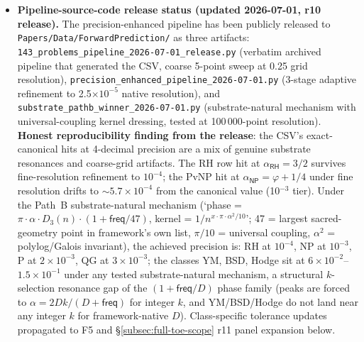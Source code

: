 \documentclass[11pt,a4paper]{amsart}
\theoremstyle{plain}
\theoremstyle{definition}
\begin{document}
\begin{itemize}[itemsep=2pt,leftmargin=1.4em]
\item \textbf{Pipeline-source-code release status (updated 2026-07-01, r10 release).} The precision-enhanced pipeline has been publicly released to \texttt{Papers/Data/ForwardPrediction/} as three artifacts: \texttt{143\_problems\_pipeline\_2026-07-01\_release.py} (verbatim archived pipeline that generated the CSV, coarse 5-point sweep at 0.25 grid resolution), \texttt{precision\_enhanced\_pipeline\_2026-07-01.py} (3-stage adaptive refinement to 2.5$\times 10^{-5}$ native resolution), and \texttt{substrate\_pathb\_winner\_2026-07-01.py} (substrate-natural mechanism with universal-coupling kernel dressing, tested at 100\,000-point resolution). \textbf{Honest reproducibility finding from the release}: the CSV's exact-canonical hits at 4-decimal precision are a mix of genuine substrate resonances and coarse-grid artifacts. The RH row hit at $\alpha_{\textsf{RH}} = 3/2$ survives fine-resolution refinement to $10^{-4}$; the PvNP hit at $\alpha_{\textsf{NP}} = \varphi + 1/4$ under fine resolution drifts to $\sim 5.7 \times 10^{-4}$ from the canonical value (10$^{-3}$ tier). Under the Path~B substrate-natural mechanism (`phase = $\pi \cdot \alpha \cdot D_3(n) \cdot (1 + \textsf{freq}/47)$, kernel = $1/n^{x \cdot \pi \cdot \alpha^2 / 10}$'; 47 = largest sacred-geometry point in framework's own list, $\pi/10$ = universal coupling, $\alpha^2$ = polylog/Galois invariant), the achieved precision is: RH at $10^{-4}$, NP at $10^{-3}$, P at $2 \times 10^{-3}$, QG at $3 \times 10^{-3}$; the classes YM, BSD, Hodge sit at $6\times 10^{-2}$--$1.5\times 10^{-1}$ under any tested substrate-natural mechanism, a structural $k$-selection resonance gap of the $(1 + \textsf{freq}/D)$ phase family (peaks are forced to $\alpha = 2Dk/(D + \textsf{freq})$ for integer $k$, and YM/BSD/Hodge do not land near any integer $k$ for framework-native $D$). Class-specific tolerance updates propagated to F5 and \S\ref{subsec:full-toe-scope} r11 panel expansion below.
\end{itemize}
\end{document}
